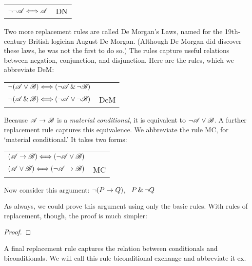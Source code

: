 \begin{center}
\begin{tabular}{rl}
$\neg\neg\mathscr{A} \Longleftrightarrow \mathscr{A}$ & DN
\end{tabular}
\end{center}

Two more replacement rules are called De Morgan's Laws, named for the 19th-century British logician August De Morgan. (Although De Morgan did discover these laws, he was not the first to do so.) The rules capture useful relations between negation, conjunction, and disjunction. Here are the rules, which we abbreviate DeM:

\begin{center}
\begin{tabular}{rl}
$\neg(\mathscr{A}\vee\mathscr{B}) \Longleftrightarrow (\neg\mathscr{A}\,\&\,\neg\mathscr{B})$\\
$\neg(\mathscr{A}\,\&\,\mathscr{B}) \Longleftrightarrow (\neg\mathscr{A}\vee\neg\mathscr{B})$
& DeM
\end{tabular}
\end{center}

Because $\mathscr{A}\rightarrow\mathscr{B}$ is a \emph{material conditional}, it is equivalent to $\neg\mathscr{A}\vee\mathscr{B}$. A further replacement rule captures this equivalence. We abbreviate the rule MC, for `material conditional.' It takes two forms:

\begin{center}
\begin{tabular}{rl}
$(\mathscr{A}\rightarrow\mathscr{B}) \Longleftrightarrow (\neg\mathscr{A}\vee\mathscr{B})$ &\\
$(\mathscr{A}\vee\mathscr{B}) \Longleftrightarrow (\neg\mathscr{A}\rightarrow\mathscr{B})$ & MC
\end{tabular}
\end{center}

Now consider this argument: $\neg(P \rightarrow Q)$, \therefore\ $P \,\&\, \neg Q$

As always, we could prove this argument using only the basic rules. With rules of replacement, though, the proof is much simpler:

\begin{proof}
\end{proof}

A final replacement rule captures the relation between conditionals and biconditionals. We will call this rule biconditional exchange and abbreviate it {\eiff}{ex}.

